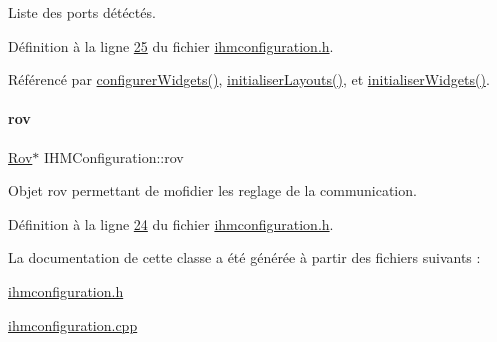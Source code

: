 Liste des ports détéctés. 



Définition à la ligne \hyperlink{ihmconfiguration_8h_source_l00025}{25} du fichier \hyperlink{ihmconfiguration_8h_source}{ihmconfiguration.\+h}.



Référencé par \hyperlink{ihmconfiguration_8cpp_source_l00033}{configurer\+Widgets()}, \hyperlink{ihmconfiguration_8cpp_source_l00051}{initialiser\+Layouts()}, et \hyperlink{ihmconfiguration_8cpp_source_l00023}{initialiser\+Widgets()}.

\mbox{\label{class_i_h_m_configuration_a75a7e5b7312d9eb3377bc96372fc0b3a}} 
\paragraph{\texorpdfstring{rov}{rov}}
{\footnotesize\ttfamily \hyperlink{class_rov}{Rov}$\ast$ I\+H\+M\+Configuration\+::rov\hspace{0.3cm}{\ttfamily [private]}}



Objet rov permettant de mofidier les reglage de la communication. 



Définition à la ligne \hyperlink{ihmconfiguration_8h_source_l00024}{24} du fichier \hyperlink{ihmconfiguration_8h_source}{ihmconfiguration.\+h}.



La documentation de cette classe a été générée à partir des fichiers suivants \+:\begin{DoxyCompactItemize}
\item 
\hyperlink{ihmconfiguration_8h}{ihmconfiguration.\+h}\item 
\hyperlink{ihmconfiguration_8cpp}{ihmconfiguration.\+cpp}\end{DoxyCompactItemize}
